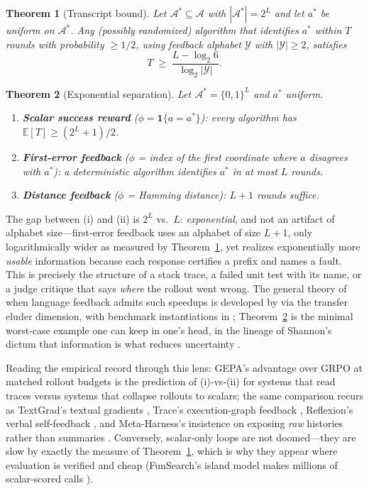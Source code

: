\documentclass{article}
\theoremstyle{plain}
\newtheorem{theorem}{Theorem}[section]
\theoremstyle{definition}
\theoremstyle{remark}
\newcommand{\A}{\mathcal{A}}
\newcommand{\Y}{\mathcal{Y}}
\newcommand{\E}{\mathbb{E}}
\begin{document}
\begin{theorem}[Transcript bound]
\label{thm:fano}
Let $\A^* \subseteq \A$ with $|\A^*| = 2^L$ and let $a^*$ be uniform on $\A^*$. Any (possibly randomized) algorithm that identifies $a^*$ within $T$ rounds with probability $\ge 1/2$, using feedback alphabet $\Y$ with $|\Y| \ge 2$, satisfies
\[
T \;\ge\; \frac{L - \log_2 6}{\log_2 |\Y|}.
\]
\end{theorem}

\begin{theorem}[Exponential separation]
\label{thm:separation}
Let $\A^* = \{0,1\}^L$ and $a^*$ uniform.
\begin{enumerate}\itemsep1pt
\item[(i)] \textbf{Scalar success reward} ($\phi = \mathbf{1}\{a = a^*\}$): every algorithm has $\E[T] \ge (2^L + 1)/2$.
\item[(ii)] \textbf{First-error feedback} ($\phi$ = index of the first coordinate where $a$ disagrees with $a^*$): a deterministic algorithm identifies $a^*$ in at most $L$ rounds.
\item[(iii)] \textbf{Distance feedback} ($\phi$ = Hamming distance): $L + 1$ rounds suffice.
\end{enumerate}
\end{theorem}

The gap between (i) and (ii) is $2^L$ vs.\ $L$: \emph{exponential}, and not an artifact of alphabet size---first-error feedback uses an alphabet of size $L{+}1$, only logarithmically wider as measured by Theorem~\ref{thm:fano}, yet realizes exponentially more \emph{usable} information because each response certifies a prefix and names a fault. This is precisely the structure of a stack trace, a failed unit test with its name, or a judge critique that says \emph{where} the rollout went wrong. The general theory of when language feedback admits such speedups is developed by \citet{xu2025llf} via the transfer eluder dimension, with benchmark instantiations in \citet{cheng2023llfbench}; Theorem~\ref{thm:separation} is the minimal worst-case example one can keep in one's head, in the lineage of Shannon's dictum that information is what reduces uncertainty \cite{shannon1948mathematical, cover2006elements}.

Reading the empirical record through this lens: GEPA's advantage over GRPO at matched rollout budgets \cite{agrawal2025gepa} is the prediction of (i)-vs-(ii) for systems that read traces versus systems that collapse rollouts to scalars; the same comparison recurs as TextGrad's textual gradients \cite{yuksekgonul2024textgrad}, Trace's execution-graph feedback \cite{cheng2024trace}, Reflexion's verbal self-feedback \cite{shinn2023reflexion}, and Meta-Harness's insistence on exposing \emph{raw} histories rather than summaries \cite{lee2026metaharness}. Conversely, scalar-only loops are not doomed---they are slow by exactly the measure of Theorem~\ref{thm:fano}, which is why they appear where evaluation is verified and cheap (FunSearch's island model makes millions of scalar-scored calls \cite{romeraparedes2024funsearch}).
\end{document}
